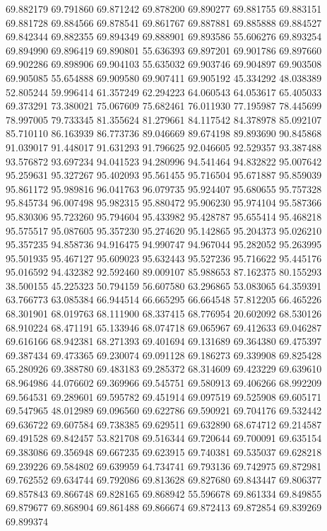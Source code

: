 69.882179
69.791860
69.871242
69.878200
69.890277
69.881755
69.883151
69.881728
69.884566
69.878541
69.861767
69.887881
69.885888
69.884527
69.842344
69.882355
69.894349
69.888901
69.893586
55.606276
69.893254
69.894990
69.896419
69.890801
55.636393
69.897201
69.901786
69.897660
69.902286
69.898906
69.904103
55.635032
69.903746
69.904897
69.903508
69.905085
55.654888
69.909580
69.907411
69.905192
45.334292
48.038389
52.805244
59.996414
61.357249
62.294223
64.060543
64.053617
65.405033
69.373291
73.380021
75.067609
75.682461
76.011930
77.195987
78.445699
78.997005
79.733345
81.355624
81.279661
84.117542
84.378978
85.092107
85.710110
86.163939
86.773736
89.046669
89.674198
89.893690
90.845868
91.039017
91.448017
91.631293
91.796625
92.046605
92.529357
93.387488
93.576872
93.697234
94.041523
94.280996
94.541464
94.832822
95.007642
95.259631
95.327267
95.402093
95.561455
95.716504
95.671887
95.859039
95.861172
95.989816
96.041763
96.079735
95.924407
95.680655
95.757328
95.845734
96.007498
95.982315
95.880472
95.906230
95.974104
95.587366
95.830306
95.723260
95.794604
95.433982
95.428787
95.655414
95.468218
95.575517
95.087605
95.357230
95.274620
95.142865
95.204373
95.026210
95.357235
94.858736
94.916475
94.990747
94.967044
95.282052
95.263995
95.501935
95.467127
95.609023
95.632443
95.527236
95.716622
95.445176
95.016592
94.432382
92.592460
89.009107
85.988653
87.162375
80.155293
38.500155
45.225323
50.794159
56.607580
63.296865
53.083065
64.359391
63.766773
63.085384
66.944514
66.665295
66.664548
57.812205
66.465226
68.301901
68.019763
68.111900
68.337415
68.776954
20.602092
68.530126
68.910224
68.471191
65.133946
68.074718
69.065967
69.412633
69.046287
69.616166
68.942381
68.271393
69.401694
69.131689
69.364380
69.475397
69.387434
69.473365
69.230074
69.091128
69.186273
69.339908
69.825428
65.280926
69.388780
69.483183
69.285372
68.314609
69.423229
69.639610
68.964986
44.076602
69.369966
69.545751
69.580913
69.406266
68.992209
69.564531
69.289601
69.595782
69.451914
69.097519
69.525908
69.605171
69.547965
48.012989
69.096560
69.622786
69.590921
69.704176
69.532442
69.636722
69.607584
69.738385
69.629511
69.632890
68.674712
69.214587
69.491528
69.842457
53.821708
69.516344
69.720644
69.700091
69.635154
69.383086
69.356948
69.667235
69.623915
69.740381
69.535037
69.628218
69.239226
69.584802
69.639959
64.734741
69.793136
69.742975
69.872981
69.762552
69.634744
69.792086
69.813628
69.827680
69.843447
69.806377
69.857843
69.866748
69.828165
69.868942
55.596678
69.861334
69.849855
69.879677
69.868904
69.861488
69.866674
69.872413
69.872854
69.839269
69.899374
